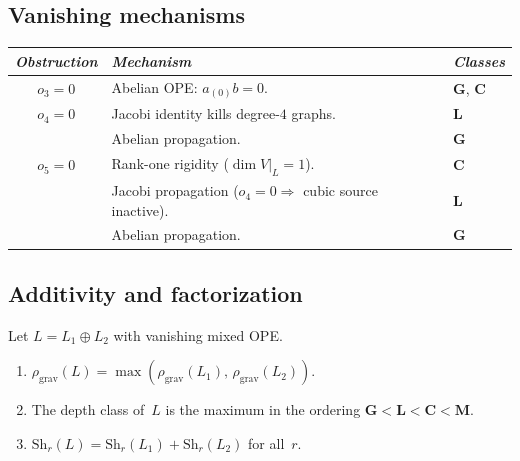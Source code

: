 
\subsection{Vanishing mechanisms}
\label{subsec:thqg-vanishing-mechanisms}

\begin{theorem}
\label{thm:thqg-vanishing-mechanisms}
\ClaimStatusProvedHere
{}
\begin{center}
\small
\renewcommand{\arraystretch}{1.25}
\begin{tabular}{cll}
\toprule
\emph{Obstruction} & \emph{Mechanism} & \emph{Classes} \\
\midrule
$o_3 = 0$ &
 Abelian OPE: $a_{(0)}b = 0$. &
 $\mathbf{G}$, $\mathbf{C}$ \\
$o_4 = 0$ &
 Jacobi identity kills degree-$4$ graphs. &
 $\mathbf{L}$ \\
 & Abelian propagation. &
 $\mathbf{G}$ \\
$o_5 = 0$ &
 Rank-one rigidity ($\dim V|_L = 1$). &
 $\mathbf{C}$ \\
 & Jacobi propagation ($o_4 = 0 \Rightarrow$
 cubic source inactive). &
 $\mathbf{L}$ \\
 & Abelian propagation. &
 $\mathbf{G}$ \\
\bottomrule
\end{tabular}
\end{center}
\end{theorem}



\subsection{Additivity and factorization}
\label{subsec:thqg-additivity}

\begin{theorem}
\label{thm:thqg-independent-sum}
\ClaimStatusProvedHere
{}
Let $L = L_1 \oplus L_2$ with vanishing mixed OPE.
\begin{enumerate}[label=\textup{(\roman*)}]
\item $\rho_{\mathrm{grav}}(L)
 = \max(\rho_{\mathrm{grav}}(L_1),\,
 \rho_{\mathrm{grav}}(L_2))$.
\item The depth class of~$L$ is the maximum in the ordering
 $\mathbf{G} < \mathbf{L} < \mathbf{C} < \mathbf{M}$.
\item $\mathrm{Sh}_r(L) = \mathrm{Sh}_r(L_1) +
 \mathrm{Sh}_r(L_2)$ for all~$r$.
\end{enumerate}
\end{theorem}

